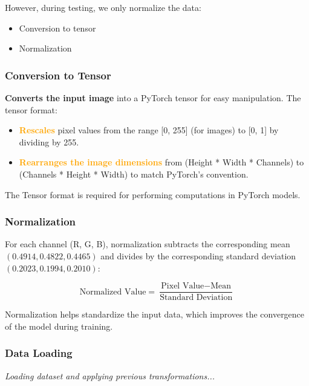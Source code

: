 However, during testing, we only normalize the data:
\begin{itemize}[noitemsep]
    \item Conversion to tensor
    \item Normalization
\end{itemize}

\subsubsection{Conversion to Tensor}
\textbf{Converts the input image} into a PyTorch tensor for easy manipulation. The tensor format:
\begin{itemize}[noitemsep]
    \item \textcolor{orange}{\textbf{Rescales}} pixel values from the range [0, 255] (for images) 
    to [0, 1] by dividing by 255.
    \item \textcolor{orange}{\textbf{Rearranges the image dimensions}} from (Height * Width * Channels)
    to (Channels * Height * Width) to match PyTorch's convention.
\end{itemize}

The Tensor format is required for performing computations in PyTorch models.

\subsubsection{Normalization}
For each channel (R, G, B), normalization subtracts the corresponding mean $(0.4914, 0.4822, 0.4465)$ 
and divides by the corresponding standard deviation $(0.2023, 0.1994, 0.2010)$:

$$\text{Normalized Value} = \frac{\text{Pixel Value} - \text{Mean}}{\text{Standard Deviation}}$$

Normalization helps standardize the input data, which improves the convergence of the model during 
training.

\subsubsection{Data Loading}
\textit{Loading dataset and applying previous transformations...}

